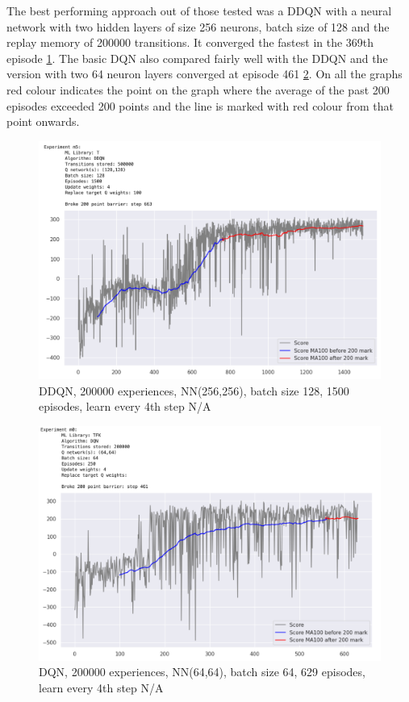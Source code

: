 \documentclass{article}
\begin{document}
The best performing approach out of those tested was a DDQN with a neural network with two hidden layers of size 256 neurons, batch size of 128 and the replay memory of 200000 transitions. It converged the fastest in the 369th episode \ref{fig:1}. The basic DQN also compared fairly well with the DDQN and the version with two 64 neuron layers converged at episode 461 \ref{fig:2}. On all the graphs red colour indicates the point on the graph where the average of the past 200 episodes exceeded 200 points and the line is marked with red colour from that point onwards.

\begin{figure}[!h]
  \centering
	\includegraphics[width=1.0\textwidth]{figures/m5.png}
  \caption{DDQN, 200000 experiences, NN(256,256), batch size 128, 1500 episodes, learn every 4th step N/A}
  \label{fig:1}
\end{figure}

\begin{figure}[!h]
  \centering
	\includegraphics[width=1.0\textwidth]{figures/m0.png}
  \caption{DQN, 200000 experiences, NN(64,64), batch size 64, 629 episodes, learn every 4th step N/A}
  \label{fig:2}
\end{figure}
\end{document}

